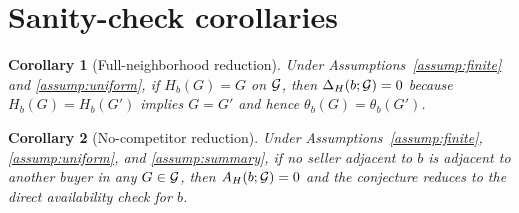 \documentclass[11pt]{article}
\theoremstyle{definition}
\theoremstyle{plain}
\newtheorem{corollary}{Corollary}
\theoremstyle{remark}
\begin{document}
\section{Sanity-check corollaries}
\begin{corollary}[Full-neighborhood reduction]\label{cor:full-neighborhood}
Under Assumptions~\ref{assump:finite} and \ref{assump:uniform}, if \(H_b(G)=G\) on \({\cal G}\), then \(\Delta_H(b;{\cal G})=0\) because \(H_b(G)=H_b(G')\) implies \(G=G'\) and hence \(\theta_b(G)=\theta_b(G')\).
\end{corollary}

\begin{corollary}[No-competitor reduction]\label{cor:no-competitor}
Under Assumptions~\ref{assump:finite}, \ref{assump:uniform}, and \ref{assump:summary}, if no seller adjacent to \(b\) is adjacent to another buyer in any \(G\in{\cal G}\), then \(A_H(b;{\cal G})=0\) and the conjecture reduces to the direct availability check for \(b\).
\end{corollary}
\end{document}
